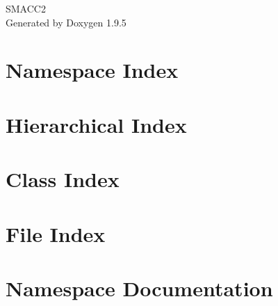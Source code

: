 \documentclass[twoside]{book}
\newcommand{\+}{\discretionary{\mbox{\scriptsize$\hookleftarrow$}}{}{}}
\newcommand{\clearemptydoublepage}{%
    \newpage{\pagestyle{empty}\cleardoublepage}%
  }
\begin{document}
  \raggedbottom
    \hypersetup{pageanchor=false,
                bookmarksnumbered=true,
                pdfencoding=unicode
               }
  \begin{titlepage}
  \vspace*{7cm}
  \begin{center}%
  {\Large SMACC2}\\
  \vspace*{1cm}
  {\large Generated by Doxygen 1.9.5}\\
  \end{center}
  \end{titlepage}
  \clearemptydoublepage
  \tableofcontents
  \clearemptydoublepage
  \hypersetup{pageanchor=true}
\chapter{Namespace Index}

\chapter{Hierarchical Index}

\chapter{Class Index}

\chapter{File Index}

\chapter{Namespace Documentation}





























\end{document}

